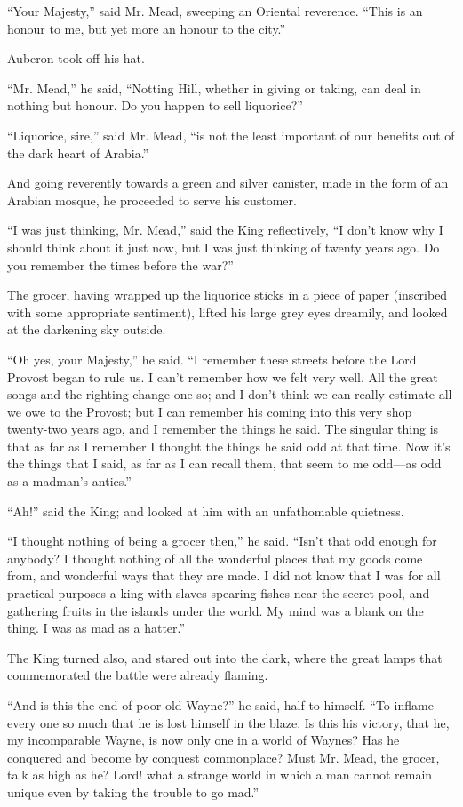 \documentclass{book}
\begin{document}
“Your Majesty,” said Mr. Mead, sweeping an Oriental reverence. “This is an honour to me, but yet more an honour to the city.”

Auberon took off his hat.

“Mr. Mead,” he said, “Notting Hill, whether in giving or taking, can deal in nothing but honour. Do you happen to sell liquorice?”

“Liquorice, sire,” said Mr. Mead, “is not the least important of our benefits out of the dark heart of Arabia.”

And going reverently towards a green and silver canister, made in the form of an Arabian mosque, he proceeded to serve his customer.

“I was just thinking, Mr. Mead,” said the King reflectively, “I don’t know why I should think about it just now, but I was just thinking of twenty years ago. Do you remember the times before the war?”

The grocer, having wrapped up the liquorice sticks in a piece of paper (inscribed with some appropriate sentiment), lifted his large grey eyes dreamily, and looked at the darkening sky outside.

“Oh yes, your Majesty,” he said. “I remember these streets before the Lord Provost began to rule us. I can’t remember how we felt very well. All the great songs and the righting change one so; and I don’t think we can really estimate all we owe to the Provost; but I can remember his coming into this very shop twenty-two years ago, and I remember the things he said. The singular thing is that as far as I remember I thought the things he said odd at that time. Now it’s the things that I said, as far as I can recall them, that seem to me odd—as odd as a madman’s antics.”

“Ah!” said the King; and looked at him with an unfathomable quietness.

“I thought nothing of being a grocer then,” he said. “Isn’t that odd enough for anybody? I thought nothing of all the wonderful places that my goods come from, and wonderful ways that they are made. I did not know that I was for all practical purposes a king with slaves spearing fishes near the secret-pool, and gathering fruits in the islands under the world. My mind was a blank on the thing. I was as mad as a hatter.”

The King turned also, and stared out into the dark, where the great lamps that commemorated the battle were already flaming.

“And is this the end of poor old Wayne?” he said, half to himself. “To inflame every one so much that he is lost himself in the blaze. Is this his victory, that he, my incomparable Wayne, is now only one in a world of Waynes? Has he conquered and become by conquest commonplace? Must Mr. Mead, the grocer, talk as high as he? Lord! what a strange world in which a man cannot remain unique even by taking the trouble to go mad.”
\end{document}
